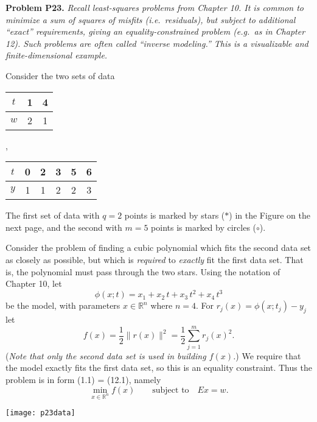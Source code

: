 \documentclass[12pt,reqno]{amsart}
\newcommand{\RR}{\mathbb{R}}
\newcommand{\prob}[1]{\bigskip\noindent\textbf{#1.}\quad }
\begin{document}
\medskip


\prob{Problem P23}   \emph{Recall least-squares problems from Chapter 10.  It is common to minimize a sum of squares of misfits (i.e.~residuals), but subject to additional ``exact'' requirements, giving an equality-constrained problem (e.g.~as in Chapter 12).  Such problems are often called ``inverse modeling.''  This is a visualizable and finite-dimensional example.}

Consider the two sets of data
\begin{center}
\begin{tabular}{c|cc}
$t$ & 1 & 4 \\ \hline
$w$ & 2 & 1
\end{tabular}\quad, \qquad
\begin{tabular}{c|ccccc}
$t$ & 0 & 2 & 3 & 5 & 6 \\ \hline
$y$ & 1 & 1 & 2 & 2 & 3
\end{tabular}
\end{center}
The first set of data with $q=2$ points is marked by stars ($\ast$) in the Figure on the next page, and the second with $m=5$ points is marked by circles ($\circ$).

Consider the problem of finding a cubic polynomial which fits the second data set as closely as possible, but which is \emph{required} to \emph{exactly} fit the first data set.  That is, the polynomial must pass through the two stars.  Using the notation of Chapter 10, let
    $$\phi(x; t) = x_1 + x_2\, t + x_3\, t^2 + x_4\, t^3$$
be the model, with parameters $x\in \RR^n$ where $n=4$.  For $r_j(x) = \phi(x; t_j) - y_j$ let
    $$f(x) = \frac{1}{2} \|r(x)\|^2 = \frac{1}{2} \sum_{j=1}^m r_j(x)^2.$$
(\emph{Note that only the second data set is used in building $f(x)$.})  We require that the model exactly fits the first data set, so this is an equality constraint.  Thus the problem is in form (1.1) = (12.1), namely
\begin{equation}
    \min_{x\in\RR^n} f(x) \qquad \text{subject to} \quad E x = w.    \label{leastsquaresconstrained}
\end{equation}


\bigskip
\begin{center}
\texttt{[image: p23data]}
\end{center}
\end{document}

